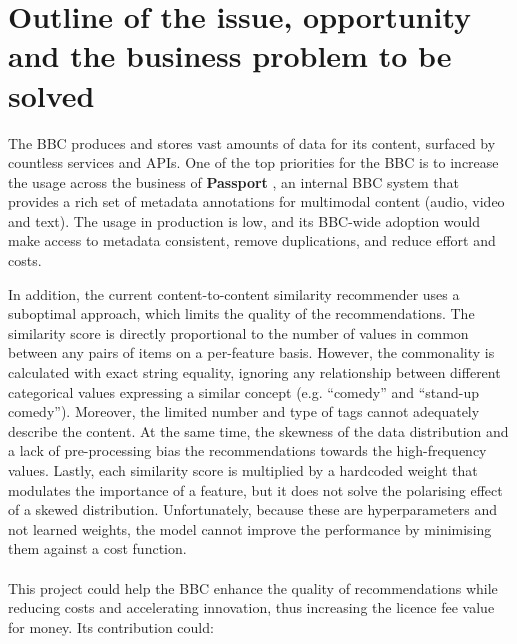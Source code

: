 
\section{Outline of the issue, opportunity and the business problem to be solved}

The BBC produces and stores vast amounts of data for its content, surfaced by countless services and APIs.
One of the top priorities for the BBC is to increase the usage across the business of \textbf{Passport} \cite{BBC:PassportMetadata},
an internal BBC system that provides a rich set of metadata annotations for multimodal content (audio, video and text).
The usage in production is low, and its BBC-wide adoption would make access to metadata consistent, remove duplications, and reduce effort and costs.

In addition, the current content-to-content similarity recommender uses a suboptimal approach, which limits the quality of the recommendations.
The similarity score is directly proportional to the number of values in common between any pairs of items
on a per-feature basis. However, the commonality is calculated with exact string equality,
ignoring any relationship between different categorical values expressing a similar concept (e.g. ``comedy'' and ``stand-up comedy'').
Moreover, the limited number and type of tags cannot adequately describe the content.
At the same time, the skewness of the data distribution and a lack of pre-processing bias the recommendations towards the high-frequency values.
Lastly, each similarity score is multiplied by a hardcoded weight that modulates the importance of a feature,
but it does not solve the polarising effect of a skewed distribution.
Unfortunately, because these are hyperparameters and not learned weights,
the model cannot improve the performance by minimising them against a cost function.
\\ \\
This project could help the BBC enhance the quality of recommendations while reducing costs and accelerating innovation,
thus increasing the licence fee value for money. Its contribution could:

